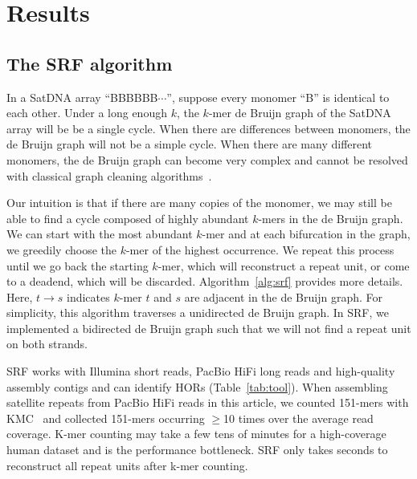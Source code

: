 \documentclass{bioinfo}
\begin{document}
\section{Results}

\subsection{The SRF algorithm}

In a SatDNA array ``{\sf BBBBBB$\cdots$}'', suppose every monomer ``{\sf B}''
is identical to each other. Under a long enough $k$, the $k$-mer de Bruijn
graph of the SatDNA array will be be a single cycle.  When there are
differences between monomers, the de Bruijn graph will not be a simple cycle.
When there are many different monomers, the de Bruijn graph can become very
complex and cannot be resolved with classical graph cleaning
algorithms~\citep{Zerbino:2008uq}.

Our intuition is that if there are many copies of the monomer, we may still be
able to find a cycle composed of highly abundant $k$-mers in the de Bruijn
graph. We can start with the most abundant $k$-mer and at each bifurcation in
the graph, we greedily choose the $k$-mer of the highest occurrence. We repeat
this process until we go back the starting $k$-mer, which will reconstruct a
repeat unit, or come to a deadend, which will be discarded.
Algorithm~\ref{alg:srf} provides more details. Here, $t\to s$ indicates $k$-mer
$t$ and $s$ are adjacent in the de Bruijn graph. For simplicity, this algorithm
traverses a unidirected de Bruijn graph. In SRF, we implemented a bidirected
de Bruijn graph such that we will not find a repeat unit on both strands.

SRF works with Illumina short reads, PacBio HiFi long reads and high-quality
assembly contigs and can identify HORs (Table~\ref{tab:tool}).  When assembling
satellite repeats from PacBio HiFi reads in this article, we counted 151-mers
with KMC~\citep{Kokot:2017aa} and collected 151-mers occurring $\ge$10 times
over the average read coverage. K-mer counting may take a few tens of minutes
for a high-coverage human dataset and is the performance bottleneck. SRF only
takes seconds to reconstruct all repeat units after k-mer counting.
\end{document}
